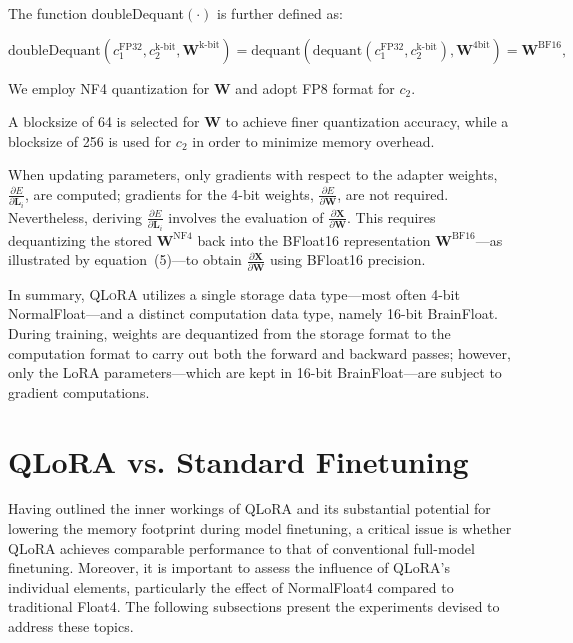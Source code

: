 The function doubleDequant$(\cdot)$ is further defined as:

\begin{equation}
    \text{doubleDequant}(c_1^{\text{FP32}}, c_2^{\text{k-bit}}, \mathbf{W}^{\text{k-bit}}) = \text{dequant}(\text{dequant}(c_1^{\text{FP32}}, c_2^{\text{k-bit}}), \mathbf{W}^{\text{4bit}}) = \mathbf{W}^{\text{BF16}},
\end{equation}

We employ NF4 quantization for $\mathbf{W}$ and adopt FP8 format for $c_2$.

A blocksize of 64 is selected for $\mathbf{W}$ to achieve finer quantization accuracy, while a blocksize of 256 is used for $c_2$ in order to minimize memory overhead.

When updating parameters, only gradients with respect to the adapter weights, $\frac{\partial E}{\partial \mathbf{L}_i}$, are computed; gradients for the 4-bit weights, $\frac{\partial E}{\partial \mathbf{W}}$, are not required. Nevertheless, deriving $\frac{\partial E}{\partial \mathbf{L}_i}$ involves the evaluation of $\frac{\partial \mathbf{X}}{\partial \mathbf{W}}$. This requires dequantizing the stored $\mathbf{W}^{\text{NF4}}$ back into the BFloat16 representation $\mathbf{W}^{\text{BF16}}$—as illustrated by equation~(5)—to obtain $\frac{\partial \mathbf{X}}{\partial \mathbf{W}}$ using BFloat16 precision.

In summary, \textsc{QLoRA} utilizes a single storage data type—most often 4-bit NormalFloat—and a distinct computation data type, namely 16-bit BrainFloat. During training, weights are dequantized from the storage format to the computation format to carry out both the forward and backward passes; however, only the LoRA parameters—which are kept in 16-bit BrainFloat—are subject to gradient computations.

\section{QLoRA vs. Standard Finetuning}
\label{sec:comp_to_std}

Having outlined the inner workings of QLoRA and its substantial potential for lowering the memory footprint during model finetuning, a critical issue is whether QLoRA achieves comparable performance to that of conventional full-model finetuning. Moreover, it is important to assess the influence of QLoRA’s individual elements, particularly the effect of NormalFloat4 compared to traditional Float4. The following subsections present the experiments devised to address these topics.

